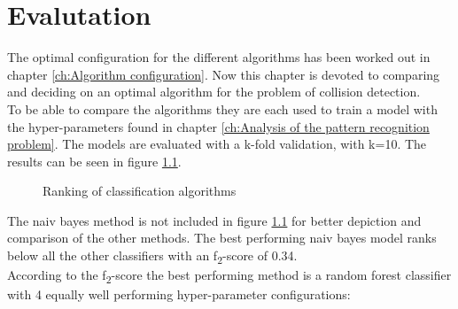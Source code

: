 \chapter{Evalutation}
\label{ch:Evalutation}
The optimal configuration for the different algorithms has been worked out in chapter \ref{ch:Algorithm configuration}. Now this chapter is devoted to comparing and deciding on an optimal algorithm for the problem of collision detection.\\
To be able to compare the algorithms they are each used to train a model with the hyper-parameters found in chapter \ref{ch:Analysis of the pattern recognition problem}. The models are evaluated with a k-fold validation, with k=10. The results can be seen in figure \ref{fig:ranking}. 


\begin{figure}[h]
\centering
{}

\caption{Ranking of classification algorithms}
\label{fig:ranking}
\end{figure}
The naiv bayes method is not included in figure \ref{fig:ranking} for better depiction and comparison of the other methods. The best performing naiv bayes model ranks below all the other classifiers with an  f\textsubscript{2}-score of 0.34. 
\\

According to the  f\textsubscript{2}-score the best performing method is a random forest classifier with 4 equally well performing hyper-parameter configurations:\\

